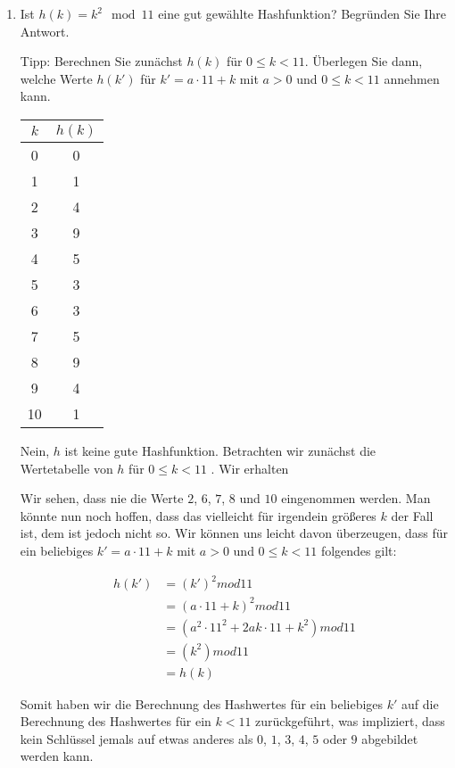 \documentclass{lehramt-informatik}
\begin{document}
\begin{enumerate}


\item Ist $h(k) = k^2 \mod 11$ eine gut gewählte Hashfunktion? Begründen
Sie Ihre Antwort.

Tipp: Berechnen Sie zunächst $h(k)$ für $0 \leq k < 11$. Überlegen Sie
dann, welche Werte $h(k')$ für $k' = a \cdot 11 + k$ mit $a > 0$ und $0
\leq k < 11$ annehmen kann.

\begin{antwort}

\begin{center}
\begin{tabular}{|c|c|}
\hline
$k$ & $h(k)$\\\hline\hline
0 & 0\\\hline
1 & 1\\\hline
2 & 4\\\hline
3 & 9\\\hline
4 & 5\\\hline
5 & 3\\\hline
6 & 3\\\hline
7 & 5\\\hline
8 & 9\\\hline
9 & 4\\\hline
10 & 1\\\hline
\end{tabular}
\end{center}

Nein, $h$ ist keine gute Hashfunktion. Betrachten wir zunächst die
Wertetabelle von $h$ für $0 \leq k < 11$ . Wir erhalten

Wir sehen, dass nie die Werte $2$, $6$, $7$, $8$ und $10$ eingenommen
werden. Man könnte nun noch hoffen, dass das vielleicht für irgendein
größeres $k$ der Fall ist, dem ist jedoch nicht so. Wir können uns
leicht davon überzeugen, dass für ein beliebiges $k' = a \cdot 11 + k$
mit $a > 0$ und $0 \leq k < 11$ folgendes gilt:

\begin{align*}
h(k')
  &= (k')^2 mod 11\\
  &= (a \cdot 11 + k)^2 mod 11\\
  &= (a^2 \cdot 11^2 + 2ak \cdot 11 + k^2) mod 11\\
  &= (k^2) mod 11\\
  &= h(k)
\end{align*}

Somit haben wir die Berechnung des Hashwertes für ein beliebiges $k'$
auf die Berechnung des Hashwertes für ein $k < 11$ zurückgeführt, was
impliziert, dass kein Schlüssel jemals auf etwas anderes als $0$, $1$,
$3$, $4$, $5$ oder $9$ abgebildet werden kann.
\end{antwort}


\end{enumerate}
\end{document}
